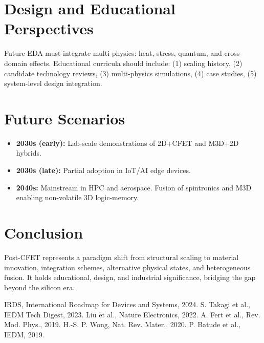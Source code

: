 \documentclass[conference]{IEEEtran}
\begin{document}
\section{Design and Educational Perspectives}
Future EDA must integrate multi-physics: heat, stress, quantum, and cross-domain effects.  
Educational curricula should include: (1) scaling history, (2) candidate technology reviews, (3) multi-physics simulations, (4) case studies, (5) system-level design integration.

\section{Future Scenarios}
\begin{itemize}
  \item \textbf{2030s (early):} Lab-scale demonstrations of 2D+CFET and M3D+2D hybrids.  
  \item \textbf{2030s (late):} Partial adoption in IoT/AI edge devices.  
  \item \textbf{2040s:} Mainstream in HPC and aerospace. Fusion of spintronics and M3D enabling non-volatile 3D logic-memory.  
\end{itemize}

\section{Conclusion}
Post-CFET represents a paradigm shift from structural scaling to material innovation, integration schemes, alternative physical states, and heterogeneous fusion.  
It holds educational, design, and industrial significance, bridging the gap beyond the silicon era.

\begin{thebibliography}{00}
 IRDS, International Roadmap for Devices and Systems, 2024.
 S. Takagi et al., IEDM Tech Digest, 2023.
 Liu et al., Nature Electronics, 2022.
 A. Fert et al., Rev. Mod. Phys., 2019.
 H.-S. P. Wong, Nat. Rev. Mater., 2020.
 P. Batude et al., IEDM, 2019.
\end{thebibliography}
\end{document}
